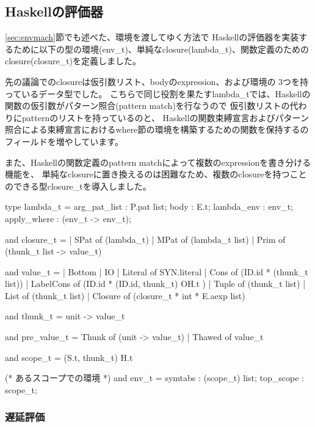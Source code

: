\documentclass[mingoth,a4paper]{jsarticle}
\begin{document}

\subsection{Haskellの評価器}

\ref{sec:envmach}節でも述べた、環境を渡してゆく方法で
Haskellの評価器を実装するために以下の型の環境(env\_t)、単純なclosure(lambda\_t)、関数定義のためのclosure(closure\_t)を定義しました。

先の議論でのclosureは仮引数リスト、bodyのexpression、および環境の 3つを持っているデータ型でした。
こちらで同じ役割を果たすlambda\_tでは、Haskellの関数の仮引数がパターン照合(pattern match)を行なうので
仮引数リストの代わりにpatternのリストを持っているのと、
Haskellの関数束縛宣言およびパターン照合による束縛宣言におけるwhere節の環境を構築するための関数を保持するのフィールドを増やしています。

また、Haskellの関数定義のpattern matchによって複数のexpressionを書き分ける機能を、
単純なclosureに置き換えるのは困難なため、複数のclosureを持つことのできる型closure\_tを導入しました。

\begin{commandline}
type lambda_t = {
  arg_pat_list : P.pat list;
  body : E.t;
  lambda_env : env_t;
  apply_where : (env_t -> env_t);
}

and closure_t =
  | SPat of (lambda_t)
  | MPat of (lambda_t list)
  | Prim of (thunk_t list -> value_t)

and value_t =
  | Bottom
  | IO
  | Literal of SYN.literal
  | Cons of (ID.id * (thunk_t list))
  | LabelCons of (ID.id * (ID.id, thunk_t) OH.t )
  | Tuple of (thunk_t list)
  | List of (thunk_t list)
  | Closure of (closure_t * int * E.aexp list)

and thunk_t = unit -> value_t

and pre_value_t =
    Thunk of (unit -> value_t)
  | Thawed of value_t

and scope_t = (S.t, thunk_t) H.t

(* あるスコープでの環境 *)
and env_t = {
  symtabs : (scope_t) list;
  top_scope : scope_t;
}
\end{commandline}

\subsubsection{遅延評価}
\end{document}
